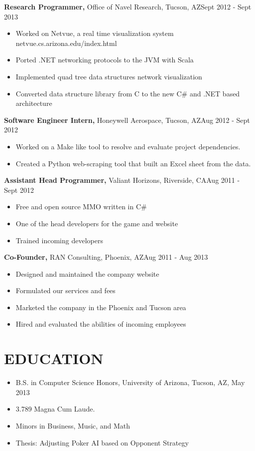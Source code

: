 \documentclass{res}
\begin{document}
\begin{resume}
  {\bf Research Programmer,} Office of Navel Research, Tucson, AZ\hfill Sept 2012 - Sept 2013
  \begin{itemize} \itemsep -2pt %
    \item Worked on Netvue, a real time visualization system netvue.cs.arizona.edu/index.html
    \item Ported .NET networking protocols to the JVM with Scala
    \item Implemented quad tree data structures network visualization
    \item Converted data structure library from C to the new C\# and .NET based architecture
  \end{itemize}

  {\bf Software Engineer Intern,} Honeywell Aerospace, Tucson, AZ\hfill Aug 2012 - Sept 2012
  \begin{itemize} \itemsep -2pt %
    \item Worked on a Make like tool to resolve and evaluate project dependencies.
    \item Created a Python web-scraping tool that built an Excel sheet from the data.
  \end{itemize}

  {\bf Assistant Head Programmer,} Valiant Horizons, Riverside, CA\hfill Aug 2011 - Sept 2012
  \begin{itemize} \itemsep -2pt %
    \item Free and open source MMO written in C\#
    \item One of the head developers for the game and website
    \item Trained incoming developers
  \end{itemize}

  {\bf Co-Founder,} RAN Consulting, Phoenix, AZ\hfill Aug 2011 - Aug 2013
  \begin{itemize} \itemsep -2pt %
    \item Designed and maintained the company website
    \item Formulated our services and fees
    \item Marketed the company in the Phoenix and Tucson area
    \item Hired and evaluated the abilities of incoming employees
  \end{itemize}

\section{EDUCATION} 
  \begin{itemize} \itemsep -2pt %
    \item B.S. in Computer Science Honors, University of Arizona, Tucson, AZ, May 2013
    \item 3.789 Magna Cum Laude. 
    \item Minors in Business, Music, and Math
    \item Thesis: Adjusting Poker AI based on Opponent Strategy
  \end{itemize}


\end{resume}
\end{document}
